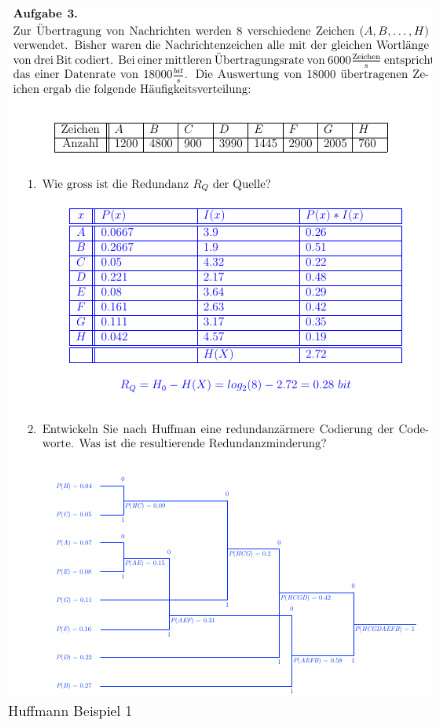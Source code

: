 \begin{figure}[h!]
	\centering
	\begin{minipage}[t]{0.9\textwidth}
		\centering
		\includegraphics[width=0.9\linewidth]{images/beispielhuffmann1}
		\caption{Huffmann Beispiel 1}
		\label{fig:huffmannbeispiel1}
	\end{minipage}
\end{figure}
\clearpage

